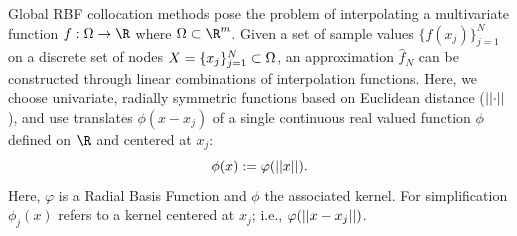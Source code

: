 \documentclass{report}
\begin{document}
{Global RBF collocation methods pose the problem of interpolating a multivariate function $f : \domain
    \rightarrow \R$ where $\domain \subset \R^m$. Given a set of sample values
    $\{f(x_j)\}_{j=1}^{N}$ on a discrete set of nodes $X = \{x_j\}_{j=1}^{N}
    \subset \Omega$, an approximation $\hat{f}_N$ can be constructed through
    linear combinations of interpolation functions. Here, we choose univariate,
    radially symmetric functions based on Euclidean distance ($\left|\left|\cdot\right|\right|$), and use
    translates $\phi(x-x_j)$ of a single continuous real
    valued function $\phi$ defined on $\R$ and centered at $x_j$:
         \begin{equation*} 
         \phi(x) := \varphi(\left|\left|x\right|\right|).
         \end{equation*} 
    Here, $\varphi$ is a
    Radial Basis Function and $\phi$ the
    associated kernel. For simplification $\phi_j(x)$ refers to a kernel centered at $x_j$; i.e., $\varphi(\left|\left|x-x_j\right|\right|)$.

}
\end{document}
